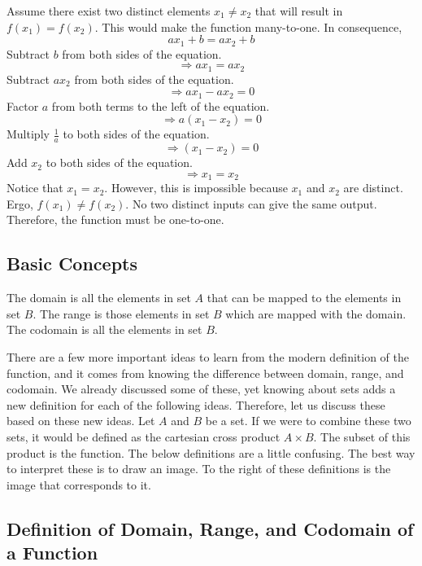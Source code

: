 Assume there exist two distinct elements $x_1 \neq x_2$ that will result in $f(x_1) = f(x_2)$. This would make the function many-to-one. In consequence,
\[
ax_1 + b = ax_2 + b
\]
Subtract $b$ from both sides of the equation.
\[
\Rightarrow ax_1 = ax_2
\]
Subtract $ax_2$ from both sides of the equation.
\[
\Rightarrow ax_1 - ax_2 = 0
\]
Factor $a$ from both terms to the left of the equation.
\[
\Rightarrow a(x_1 - x_2) = 0
\]
Multiply $\frac{1}{a}$ to both sides of the equation.
\[
\Rightarrow (x_1 - x_2) = 0
\]
Add $x_2$ to both sides of the equation.
\[
\Rightarrow x_1 = x_2
\]
Notice that $x_1 = x_2$. However, this is impossible because $x_1$ and $x_2$ are distinct. Ergo, $f(x_1) \neq f(x_2)$. No two distinct inputs can give the same output. Therefore, the function must be one-to-one.

\subsection{Basic Concepts}
\label{sss:basi-3f1b}

The domain is all the elements in set $A$ that can be mapped to the elements in set $B$. The range is those elements in set $B$ which are mapped with the domain. The codomain is all the elements in set $B$.


There are a few more important ideas to learn from the modern definition of the function, and it comes from knowing the difference between domain, range, and codomain. We already discussed some of these, yet knowing about sets adds a new definition for each of the following ideas. Therefore, let us discuss these based on these new ideas. Let $A$ and $B$ be a set. If we were to combine these two sets, it would be defined as the cartesian cross product $A \times B$. The subset of this product is the function. The below definitions are a little confusing. The best way to interpret these is to draw an image. To the right of these definitions is the image that corresponds to it.

\subsection{Definition of Domain, Range, and Codomain of a Function}
\label{sss:defi-62c6}

